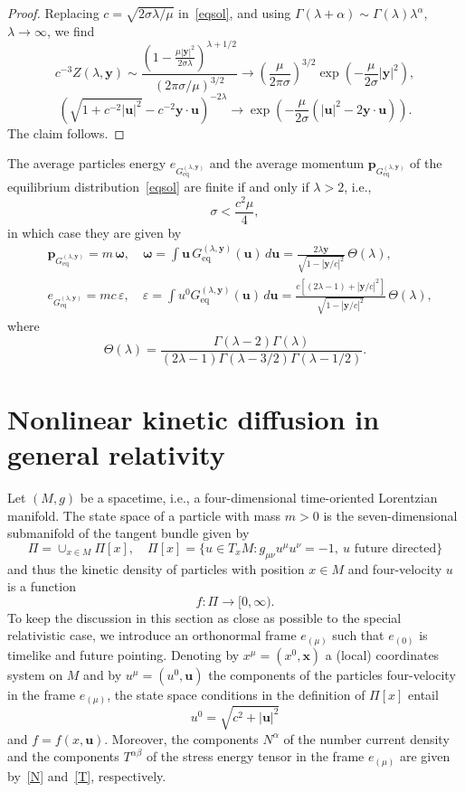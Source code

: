 \documentclass[12pt]{article}
\theoremstyle{definition}
\numberwithin{equation}{section}
\begin{document}
\begin{proof}
Replacing $c=\sqrt{2\sigma\lambda/\mu}$ in~\eqref{eqsol}, and using $\Gamma(\lambda+\alpha)\sim \Gamma(\lambda)\lambda^\alpha$, $\lambda\to\infty$, we find
\[
c^{-3}Z(\lambda,{\bm y})\sim \frac{\left(1-\displaystyle{\frac{\mu|{\bm y}|^2}{2\sigma\lambda}}\right)^{\lambda+1/2}}{(2\pi\sigma/\mu)^{3/2}}\to \left(\frac{\mu}{2\pi\sigma}\right)^{3/2}\exp\left({\displaystyle{-\frac{\mu}{2\sigma}|{\bm y}|^2}}\right),
\]
\[
\left(\sqrt{1+c^{-2}|{\bm u}|^2}-c^{-2}{\bm y}\cdot {\bm u}\right)^{-2\lambda}%
\to \exp\left({-\frac{\mu}{2\sigma}(|{\bm u}|^2-2{\bm y}\cdot{\bm u})}\right).
\]
The claim follows.
\end{proof}



The average particles energy $e_{G_\mathrm{eq}^{(\lambda,{\bm y})}}$ and the average momentum ${\bm p}_{G_\mathrm{eq}^{(\lambda,{\bm y})}}$ of the equilibrium distribution~\eqref{eqsol} are finite if and only if
$\lambda>2$, i.e.,
\[
\sigma<\frac{c^2\mu}{4},
\]
in which case they are given by
\begin{align*}
&{\bm p}_{G_\mathrm{eq}^{(\lambda,{\bm y})}}=m\,{\bm \omega},\quad {\bm \omega}=\int {\bm u}\,G_\mathrm{eq}^{(\lambda,{\bm y})}({\bm u})\,d{\bm u}=\frac{2\lambda {\bm y}}{\sqrt{1-|{\bm y}/c|^2}}\,\Theta(\lambda),\\
&e_{G_\mathrm{eq}^{(\lambda,{\bm y})}}=mc\,\varepsilon,\quad \varepsilon=\int u^0G_\mathrm{eq}^{(\lambda,{\bm y})}({\bm u})\,d{\bm u}=\frac{c[(2\lambda-1)+|{\bm y}/c|^2]}{\sqrt{1-|{\bm y}/c|^2}}\,\Theta(\lambda),
\end{align*}
where
\[
\Theta(\lambda)=\frac{\Gamma(\lambda-2)\Gamma(\lambda)}{(2\lambda-1)\Gamma(\lambda-3/2)\Gamma(\lambda-1/2)}.
\]

\section{Nonlinear kinetic diffusion in general relativity}\label{genrelsec}
Let $(M,g)$ be a spacetime, i.e., a four-dimensional time-oriented Lorentzian manifold. The state space of a particle with mass $m>0$ is the seven-dimensional submanifold of the tangent bundle given by
\[
\Pi=\cup_{x\in M}\Pi[x],\quad \Pi[x]=\{u\in T_x M: g_{\mu\nu}u^\mu u^\nu=-1,\ u \text{ future directed}\}
\] 
and thus the kinetic density of particles with position $x\in M$ and four-velocity $u$ is a function
\[
f:\Pi\to [0,\infty).
\]
To keep the discussion in this section as close as possible to the special relativistic case, we introduce an orthonormal frame  $e_{(\mu)}$  such that $e_{(0)}$ is timelike and future pointing. Denoting by $x^\mu=(x^0,{\bm x})$ a (local) coordinates system on $M$ and by $u^\mu=(u^0,{\bm u})$ the components of the particles four-velocity in the frame $e_{(\mu)}$, the state space conditions in the definition of $\Pi[x]$ entail 
\[
u^0=\sqrt{c^2+|{\bm u}|^2}
\]
and $f=f(x,{\bm u})$. Moreover, the components $N^\alpha$ of the number current density and the components $T^{\alpha\beta}$ of the stress energy tensor in the frame $e_{(\mu)}$ are given by~\eqref{N} and~\eqref{T}, respectively.  
\end{document}
